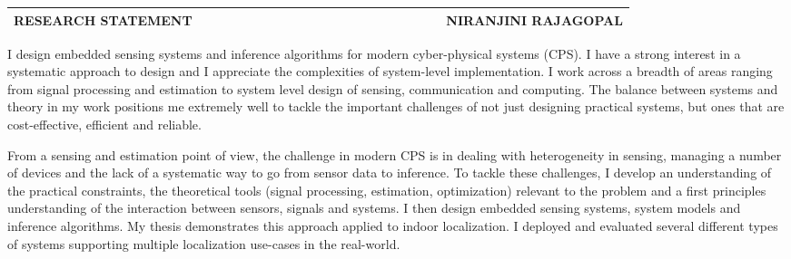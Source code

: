 \documentclass[10pt]{article}
\date{}
\begin{document}


\begin{table}
\color{blue}
\begin{tabular*}{\textwidth}{l r}
\large\textbf{RESEARCH STATEMENT} & 
\hfill \ \ \ \ \ \ \ \ \ \ \ \ \ \ \ \ \ \ \ \
\ \ \ \ \ \ \ \ \ \ \ \ \ 
\large\textbf{NIRANJINI RAJAGOPAL}\\
\hline
\end{tabular*}

\end{table}
 

I design embedded sensing systems and inference algorithms for modern cyber-physical systems (CPS). %
I have a strong interest in a systematic approach to design and I appreciate the complexities of system-level implementation.  
I work across a breadth of areas ranging from signal processing and estimation to system level design of sensing, communication and computing.
The balance between systems and theory in my work positions me extremely well to tackle the important challenges of not just designing practical systems, but ones that are cost-effective, efficient and reliable. 

From a sensing and estimation point of view, the challenge in modern CPS is in dealing with heterogeneity in sensing, managing a number of devices and the lack of a systematic way to go from sensor data to inference. 
To tackle these challenges, I develop an understanding of the practical constraints, the theoretical tools (signal processing, estimation, optimization) relevant to the problem and a first principles understanding of the interaction between sensors, signals and systems. I then design embedded sensing systems, system models and inference algorithms. My thesis demonstrates this approach applied to indoor localization. I deployed and evaluated several different types of systems supporting multiple localization use-cases in the real-world.
\end{document}
